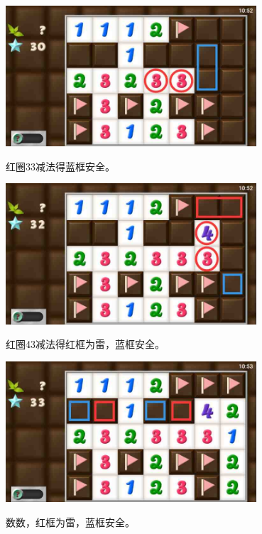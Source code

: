 \begin{center}
    \includegraphics[width=0.7\textwidth]{puzzlelow/222-4.jpg}
\end{center}
红圈33减法得蓝框安全。
\begin{center}
    \includegraphics[width=0.7\textwidth]{puzzlelow/222-5.jpg}
\end{center}
红圈43减法得红框为雷，蓝框安全。
\begin{center}
    \includegraphics[width=0.7\textwidth]{puzzlelow/222-6.jpg}
\end{center}
数数，红框为雷，蓝框安全。

